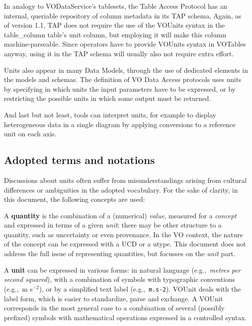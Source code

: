 \documentclass[11pt,a4paper]{ivoa}
\newcommand{\unit}[1]{\texttt{\small\color{orange}#1}}
\def\eg{e.g.,~}
\begin{document}
In analogy to VODataService's tablesets, the Table Access Protocol
\citep{2019ivoa.spec.0927D} has an internal, queriable repository of
column metadata in its TAP schema, Again, as of version 1.1, TAP does
not require the use of the VOUnits syntax in the table\_column table's
unit column, but employing it will make this column machine-parseable.
Since operators have to provide VOUnits syntax in VOTables anyway, using
it in the TAP schema will usually also not require extra effort.

Units also appear in many Data Models, through the use of dedicated elements in
the models and schemas.
The definition of VO Data Access protocols uses units by specifying in which units the input
parameters have to be expressed, or by restricting the possible units in which some
output must be returned.

And last but not least, tools can interpret units, for example to display
heterogeneous data in a single diagram by applying conversions to a reference
unit on each axis.

\subsection{Adopted terms and notations\label{sec:notations}}

Discussions about units often suffer from misunderstandings arising from cultural
differences or ambiguities in the adopted vocabulary. For the sake of clarity, in this
document, the following concepts are used:

A \textbf{quantity} is the combination of a (numerical) {\em
value}, measured for a {\em concept} and expressed in terms of a given
{\em unit}; there may be other structure to a quantity, such as
uncertainty or even provenance.
In the VO context, the nature of the concept can be expressed with a UCD or a utype. This document does not address the full issue of
representing quantities, but focusses on the {\em unit} part.

A \textbf{unit} can be expressed in various forms: in natural language
(\eg \emph{metres per second squared}), with a combination of symbols
with typographic conventions (\eg m s$^{-2}$), or by a simplified text
label (\eg \unit{m.s-2}). VOUnit deals with the label form, which is
easier to standardize, parse and exchange. A VOUnit corresponds in the
most general case to a combination of several (possibly prefixed)
symbols with mathematical operations expressed in a controlled syntax.
\end{document}
